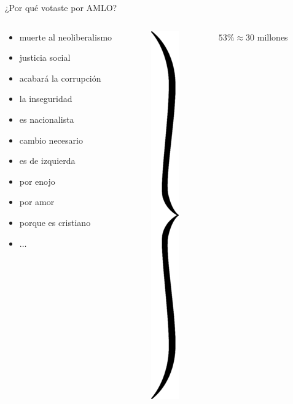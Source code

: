 \documentclass[bigger]{beamer}
\begin{document}
\begin{frame}[label={sec:org1121ebd}]{¿Por qué votaste por AMLO?}
\begin{columns}
\begin{column}{.5\columnwidth}
\begin{itemize}
\item muerte al neoliberalismo
\item justicia social
\item acabará la corrupción
\item la inseguridad
\item es nacionalista
\item cambio necesario
\item es de izquierda
\item por enojo
\item por amor
\item porque es cristiano
\item \(\ldots\)
\end{itemize}
\end{column}
\begin{column}{.1\columnwidth}
\includegraphics[height=.9\textheight]{./pics/accolade.png}
\end{column}
\begin{column}{.4\columnwidth}
\(53\% \approx 30\) millones
\end{column}
\end{columns}
\end{frame}
\end{document}
